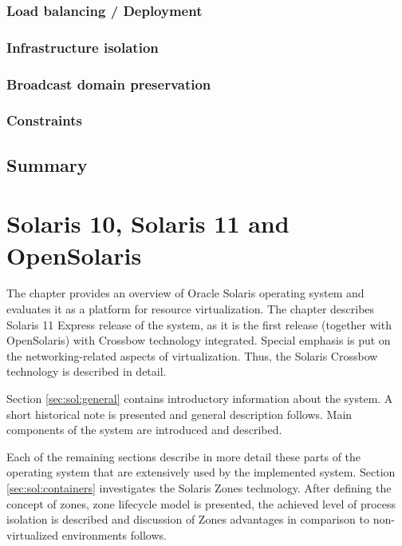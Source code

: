 \documentclass[11pt]{book}
\begin{document}
      \subsection{Load balancing / Deployment}

      \subsection{Infrastructure isolation}

      \subsection{Broadcast domain preservation}

      \subsection{Constraints}


    \section*{Summary}


  \chapter{Solaris 10, Solaris 11 and OpenSolaris}
  

    The chapter provides an overview of Oracle Solaris operating system and evaluates it as a platform for resource
    virtualization. The chapter describes Solaris 11 Express release of the system, as it is the first release
    (together with OpenSolaris) with Crossbow technology integrated. Special emphasis is put on the networking-related
    aspects of virtualization. Thus, the Solaris Crossbow technology is described in detail.

    Section \ref{sec:sol:general} contains introductory information about the system. A short historical note is
    presented and general description follows. Main components of the system are introduced and described.
    
    Each of the remaining sections describe in more detail these parts of the operating system that are extensively
    used by the implemented system. Section \ref{sec:sol:containers} investigates the Solaris Zones technology. After
    defining the concept of zones, zone lifecycle model is presented, the achieved level of process isolation is
    described and discussion of Zones advantages in comparison to non-virtualized environments follows.
\end{document}
